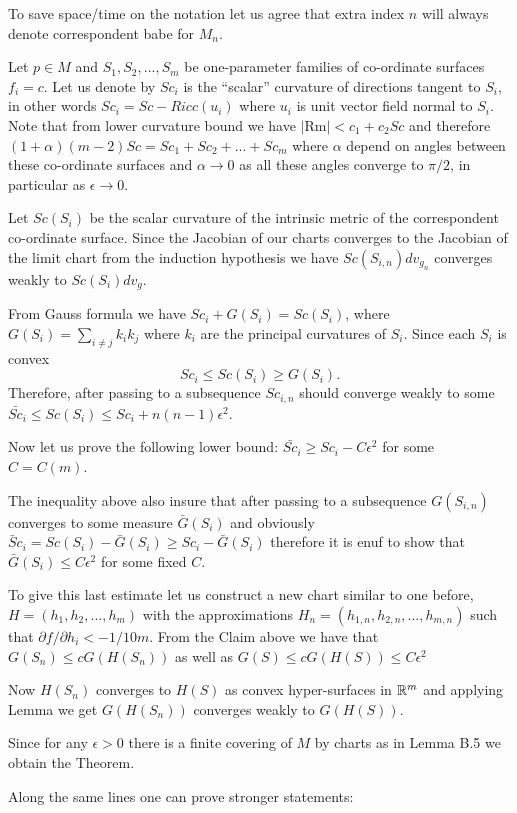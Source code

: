 \documentclass{article}
\begin{document}
To save space/time on the notation let us agree that extra index
$n$ will always denote correspondent babe for $M_n$.

Let $p\in M$ and $S_1,S_2,...,S_m$ be one-parameter families of
 co-ordinate surfaces $f_i=c$.
Let us denote by $Sc_i$ is the ``scalar'' curvature of directions tangent  to $S_i$, in other words $Sc_i=Sc-Ricc(u_i)$ where $u_i$ is unit vector field normal to $S_i$.
Note that from lower curvature bound we have $|\text{Rm}|<c_1+c_2Sc$
and therefore $(1+\alpha)(m-2)Sc=Sc_1+Sc_2+...+Sc_m$
where $\alpha$ depend on angles between these co-ordinate
surfaces and $\alpha\to 0$
as all these angles converge to $\pi/2$, in particular as $\epsilon\to 0$.


Let $Sc(S_i)$ be the scalar curvature of the intrinsic metric of the correspondent
co-ordinate surface. Since the Jacobian of our charts converges to the Jacobian of
the limit chart from the induction hypothesis we have $Sc({S_{i,n}})dv_{g_n}$
converges weakly to $Sc(S_i)dv_g$.

From Gauss formula we have $Sc_i+G(S_i)= Sc(S_i)$, where
$G(S_i)=\sum_{i\not=j}k_ik_j$ where $k_i$ are the principal
curvatures of $S_i$. Since each $S_i$ is convex
$$Sc_i\le Sc(S_i)\ge G(S_i).$$
Therefore, after passing to a subsequence
$Sc_{i,n}$ should converge weakly to some
$\bar{Sc}_i\le Sc(S_i)\le Sc_i+n(n-1)\epsilon^2$.

Now let us prove the following lower bound: $\bar {Sc}_i\ge  Sc_i-C\epsilon^2$ for some $C=C(m)$.

The inequality above also insure that after passing to a subsequence $G(S_{i,n})$
 converges to some measure $\bar G(S_i)$ and obviously
$\bar Sc_i=Sc(S_i)-\bar G(S_i)\ge Sc_i-\bar G(S_i)$
therefore it is enuf to show that $\bar G(S_i)\le C\epsilon^2$ for some fixed $C$.

To give this last estimate let us construct a new chart similar to
one before, $H=(h_1,h_2,...,h_m)$ with the approximations
$H_n=(h_{1,n},h_{2,n},...,h_{m,n})$ such that $\partial f/\partial
h_i<-1/10m$. From the Claim above we have that $G(S_n)\le c
G(H(S_n))$ as well as $G(S)\le c G(H(S))\le C\epsilon^2$

Now $H(S_n)$ converges to $H(S)$ as convex hyper-surfaces in $\mathbb{R}^m$
and applying Lemma we get $G(H(S_n))$ converges weakly to $G(H(S))$.

Since for any $\epsilon>0$ there is a finite covering of $M$ by charts as in Lemma B.5 we obtain the Theorem. \qeds


Along the same lines one can prove stronger statements:
\end{document}
